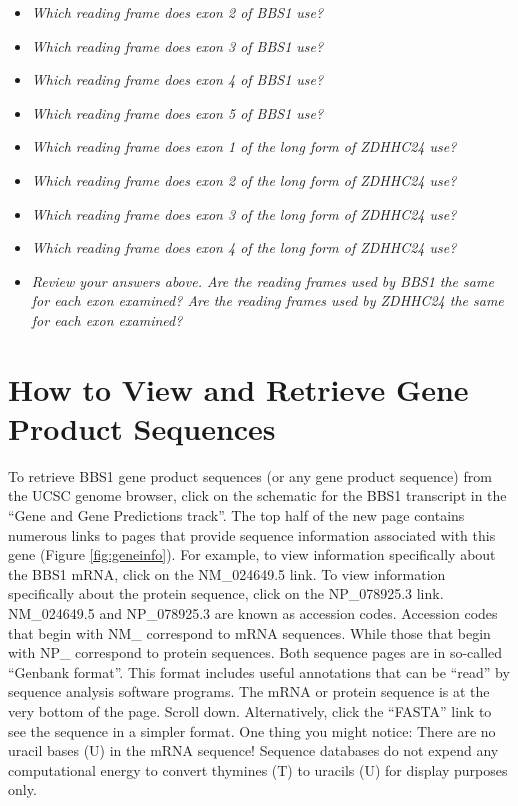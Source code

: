 \documentclass[
]{book}
\providecommand{\tightlist}{%
  \setlength{\itemsep}{0pt}\setlength{\parskip}{0pt}}
\begin{document}
\begin{itemize}
\tightlist
\item
  \emph{Which reading frame does exon 2 of BBS1 use?}
\item
  \emph{Which reading frame does exon 3 of BBS1 use?}
\item
  \emph{Which reading frame does exon 4 of BBS1 use?}
\item
  \emph{Which reading frame does exon 5 of BBS1 use?}
\item
  \emph{Which reading frame does exon 1 of the long form of ZDHHC24 use?}
\item
  \emph{Which reading frame does exon 2 of the long form of ZDHHC24 use?}
\item
  \emph{Which reading frame does exon 3 of the long form of ZDHHC24 use?}
\item
  \emph{Which reading frame does exon 4 of the long form of ZDHHC24 use?}
\item
  \emph{Review your answers above. Are the reading frames used by BBS1 the same for each exon examined? Are the reading frames used by ZDHHC24 the same for each exon examined?}
\end{itemize}

\hypertarget{how-to-view-and-retrieve-gene-product-sequences}{%
\section{How to View and Retrieve Gene Product Sequences}\label{how-to-view-and-retrieve-gene-product-sequences}}

To retrieve BBS1 gene product sequences (or any gene product sequence) from the UCSC genome browser, click on the schematic for the BBS1 transcript in the ``Gene and Gene Predictions track''. The top half of the new page contains numerous links to pages that provide sequence information associated with this gene (Figure \ref{fig:geneinfo}). For example, to view information specifically about the BBS1 mRNA, click on the NM\_024649.5 link. To view information specifically about the protein sequence, click on the NP\_078925.3 link. NM\_024649.5 and NP\_078925.3 are known as accession codes. Accession codes that begin with NM\_ correspond to mRNA sequences. While those that begin with NP\_ correspond to protein sequences. Both sequence pages are in so-called ``Genbank format''. This format includes useful annotations that can be ``read'' by sequence analysis software programs. The mRNA or protein sequence is at the very bottom of the page. Scroll down. Alternatively, click the ``FASTA'' link to see the sequence in a simpler format. One thing you might notice: There are no uracil bases (U) in the mRNA sequence! Sequence databases do not expend any computational energy to convert thymines (T) to uracils (U) for display purposes only.
\end{document}

